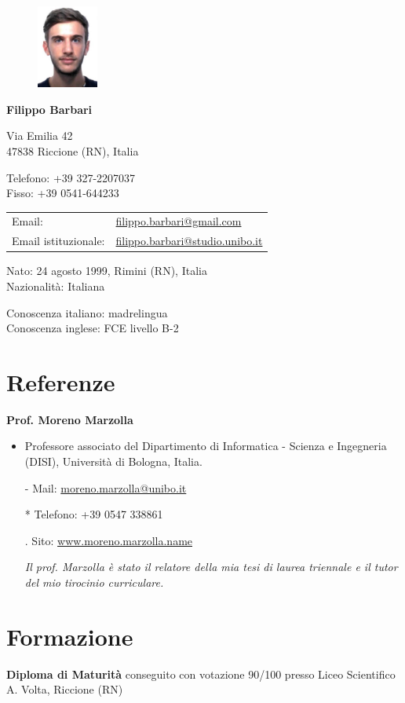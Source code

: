 \documentclass{article}
\newcommand{\years}[1]{\marginnote{\small #1}} %
\newcommand{\referenza}[6]{
	\textbf{#1}
	\begin{itemize}
		\setlength\itemsep{0em}
		\item #2
		\item[-] Mail: #3
		\item[*] Telefono: #4
		\item[.] Sito: #5
		\item[] \textit{#6}
	\end{itemize}
}
\newcommand{\https}[1]{\href{https://#1}{#1}}
\begin{document}
	
	\begin{figure}
		\includegraphics[width=0.18\textwidth]{fototessera}
	\end{figure}
		
	{\LARGE\bfseries Filippo Barbari} %
	\bigskip
	
	Via Emilia 42\\ %
	47838 Riccione (RN), Italia
	\medskip %
	
	Telefono: +39 327-2207037\\
	Fisso: +39 0541-644233
	\medskip
	
	\noindent
	\begin{tabular}{ll}
		Email: & \href{mailto:filippo.barbari@gmail.com}{filippo.barbari@gmail.com}\\
		Email istituzionale: & \href{mailto:filippo.barbari@studio.unibo.it}{filippo.barbari@studio.unibo.it}
	\end{tabular}
	\medskip
	
	Nato: 24 agosto 1999, Rimini (RN), Italia\\ %
	Nazionalità: Italiana %
	\medskip
	
	Conoscenza italiano: madrelingua\\
	Conoscenza inglese: FCE livello B-2
	
	\section*{Referenze}
	
	\referenza{Prof. Moreno Marzolla}
	{Professore associato del Dipartimento di Informatica - Scienza e Ingegneria (DISI), Università di Bologna, Italia.}
	{\href{mailto:moreno.marzolla@unibo.it}{moreno.marzolla@unibo.it}}
	{+39 0547 338861}
	{\https{www.moreno.marzolla.name}}
	{\textit{Il prof. Marzolla è stato il relatore della mia tesi di laurea triennale e il tutor del mio tirocinio curriculare.}}
	
	\section*{Formazione}
	\years{2013 - 2018} \textbf{Diploma di Maturità} conseguito con votazione 90/100 presso Liceo Scientifico A. Volta, Riccione (RN)\\
	
\end{document}

